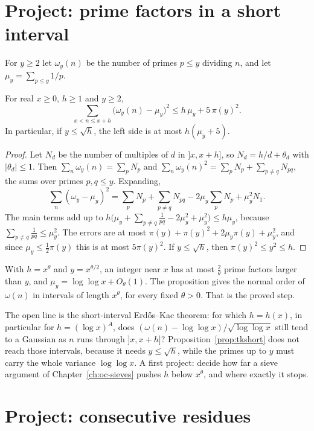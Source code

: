 \section{Project: prime factors in a short interval}\label{sec:projectomega}

For $y\ge2$ let $\omega_y(n)$ be the number of primes $p\le y$ dividing $n$, and let $\mu_y=\sum_{p\le y}1/p$.

\begin{proposition}\label{prop:tkshort}
For real $x\ge0$, $h\ge1$ and $y\ge2$,
\[
\sum_{x<n\le x+h}\bigl(\omega_y(n)-\mu_y\bigr)^2\le h\,\mu_y+5\,\pi(y)^2.
\]
In particular, if $y\le\sqrt h$, the left side is at most $h(\mu_y+5)$.
\end{proposition}
\begin{proof}
Let $N_d$ be the number of multiples of $d$ in $]x,x+h]$, so $N_d=h/d+\theta_d$ with $|\theta_d|\le1$. Then $\sum_n\omega_y(n)=\sum_pN_p$ and $\sum_n\omega_y(n)^2=\sum_pN_p+\sum_{p\ne q}N_{pq}$, the sums over primes $p,q\le y$. Expanding,
\[
\sum_n(\omega_y-\mu_y)^2=\sum_pN_p+\sum_{p\ne q}N_{pq}-2\mu_y\sum_pN_p+\mu_y^2N_1.
\]
The main terms add up to $h\bigl(\mu_y+\sum_{p\ne q}\frac1{pq}-2\mu_y^2+\mu_y^2\bigr)\le h\mu_y$, because $\sum_{p\ne q}\frac1{pq}\le\mu_y^2$. The errors are at most $\pi(y)+\pi(y)^2+2\mu_y\pi(y)+\mu_y^2$, and since $\mu_y\le\frac12\pi(y)$ this is at most $5\pi(y)^2$. If $y\le\sqrt h$, then $\pi(y)^2\le y^2\le h$.
\end{proof}

With $h=x^\theta$ and $y=x^{\theta/2}$, an integer near $x$ has at most $\frac2\theta$ prime factors larger than $y$, and $\mu_y=\log\log x+O_\theta(1)$. The proposition gives the normal order of $\omega(n)$ in intervals of length $x^\theta$, for every fixed $\theta>0$. That is the proved step.

The open line is the short-interval Erd\H{o}s--Kac theorem: for which $h=h(x)$, in particular for $h=(\log x)^A$, does $(\omega(n)-\log\log x)/\sqrt{\log\log x}$ still tend to a Gaussian as $n$ runs through $]x,x+h]$? Proposition~\ref{prop:tkshort} does not reach those intervals, because it needs $y\le\sqrt h$, while the primes up to $y$ must carry the whole variance $\log\log x$. A first project: decide how far a sieve argument of Chapter~\ref{ch:oc-sieves} pushes $h$ below $x^\theta$, and where exactly it stops.

\section{Project: consecutive residues}\label{sec:projectconsecutive}

